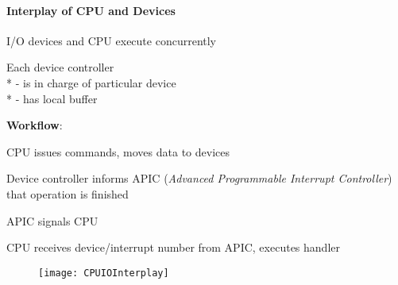 \paragraph{Interplay of CPU and Devices}
\begin{items}
	\item I/O devices and CPU execute concurrently
	\item Each device controller \\*
		- is in charge of particular device \\*
		- has local buffer
	\item \textbf{Workflow}:
	\begin{enumeration}
		\item CPU issues commands, moves data to devices
		\item Device controller informs APIC (\emph{Advanced Programmable Interrupt Controller}) that operation is finished
		\item APIC signals CPU
		\item CPU receives device/interrupt number from APIC, executes handler
	\end{enumeration}
	\begin{figure}[H]\centering\label{CPUIOInterplay}\texttt{[image: CPUIOInterplay]}\end{figure}
\end{items}

